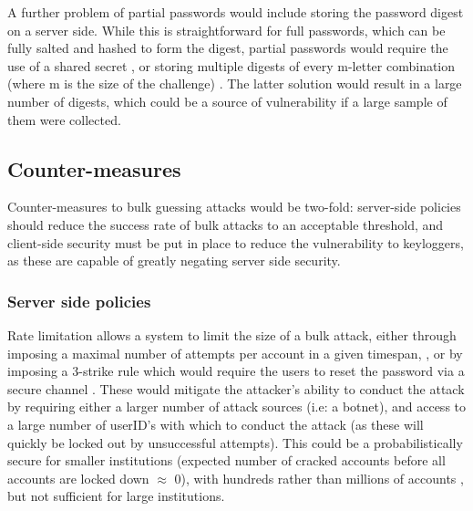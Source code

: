 \documentclass[british,11pt,a4paper]{article}
\begin{document}
A further problem of partial passwords would include storing the password digest on a server side. While this is straightforward for full passwords, which can be fully salted and hashed to form the digest, partial passwords would require the use of a shared secret \cite{smartarchitect}, or storing multiple digests of every m-letter combination (where m is the size of the challenge) \cite{smartarchitect}. The latter solution would result in a large number of digests, which could be a source of vulnerability if a large sample of them were collected. 





\subsection{Counter-measures}
Counter-measures to bulk guessing attacks would be two-fold: server-side policies should reduce the success rate of bulk attacks to an acceptable threshold, and client-side security must be put in place to reduce the vulnerability to keyloggers, as these are capable of greatly negating server side security. 

\subsubsection{Server side policies}
Rate limitation allows a system to limit the size of a bulk attack, either through imposing a maximal number of attempts per account in a given timespan, \cite{Florencio2007-yp}, or by imposing a 3-strike rule which would require the users to reset the password via a secure channel \cite{Florencio2007-yp}. These would mitigate the attacker's ability to conduct the attack by requiring either a larger number of attack sources (i.e: a botnet), and access to a large number of userID's with which to conduct the attack (as these will quickly be locked out by unsuccessful attempts). This could be a probabilistically secure for smaller institutions (expected number of cracked accounts before all accounts are locked down $\approx$ 0), with hundreds rather than millions of accounts \cite{Florencio2007-yp}, but not sufficient for large institutions. 
\end{document}
